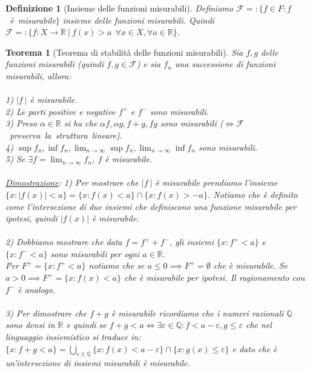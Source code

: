 \documentclass[a4paper,12pt]{report}
\newtheorem{teorema}{Teorema}[chapter]
\newtheorem{definizione}{Definizione}[chapter]
\newcommand{\lt}{<}
\newcommand{\gt}{>}
\begin{document}
\begin{definizione}[Insieme delle funzioni misurabili]
   Definiamo \mbox{$\mathcal{F}=:\{f \in F: f$ è misurabile$\}$} insieme delle funzioni misurabili. Quindi $\mathcal{F}=:\{f:X \to \mathbb{R} \ | \ f(x) \gt a \ \ \forall x \in X, \forall a \in \mathbb{R}\}$.
\end{definizione}

\begin{teorema}[Teorema di stabilità delle funzioni misurabili]\label{thm: 3.1} 
Sia $f,g$ delle funzioni misurabili (quindi $f,g \in \mathcal{F}$) e sia $f_n$ una successione di funzioni misurabili, allora:
\\
\\ 1) $|f \ |$ è misurabile.
\\ 2) Le parti positive e negative $f^+$ e $f^-$ sono misurabili.
\\ 3) Preso $\alpha \in \mathbb{R}$ si ha che $\alpha f, \alpha g, f+g, fg$ sono misurabili \mbox{($\iff \mathcal{F}$ preserva la struttura lineare).} 
\\ 4) $\sup f_n, \inf f_n, \displaystyle\lim_{n\to \infty}\sup f_n, \lim_{n\to \infty} \inf f_n$ sono misurabili.
\\ 5) Se $\exists f=\displaystyle\lim_{n\to\infty}f_n$, $f$ è misurabile.
\\
\\ \underline{Dimostrazione}: 1) Per mostrare che $|f \ |$ è misurabile prendiamo l'insieme 
\\$\{x: |f(x)|\lt a\}=\{x:f(x) \lt a\} \cap \{x: f(x) \gt - a\}$. Notiamo che è definito come l'intersezione di due insiemi che definiscono una funzione misurabile per ipotesi, quindi $|f(x)|$ è misurabile.
\\
\\ 2) Dobbiamo mostrare che data $f=f^++f^-$, gli insiemi $\{x: f^+\lt a\}$ e $\{x: f^- \lt a\}$ sono misurabili per ogni $a \in \mathbb{R}$.
\\ Per $F^+=\{x:f^+ \lt a\}$ notiamo che se $a \leq 0 \implies F^+=\emptyset$ che è misurabile. Se $a \gt 0\implies F^+=\{x:f(x)\lt a\}$ che è misurabile per ipotesi. Il ragionamento con $f^-$ è analogo.
\\
\\ 3) Per dimostrare che $f+g$ è misurabile ricordiamo che i numeri razionali $\mathbb{Q}$ sono densi in $\mathbb{R}$ e quindi se $f+g \lt a \iff \exists \varepsilon \in \mathbb{Q}: f\lt a-\varepsilon , g\leq \varepsilon$ che nel linguaggio insiemistico si traduce in: $\{x: f+g \lt a\}=\displaystyle\bigcup_{\varepsilon \in \mathbb{Q}}\{x:f(x)\lt a-\varepsilon\} \cap\{x:g(x) \leq\varepsilon\}$ e dato che è un'intersezione di insiemi misurabili è misurabile.

\end{teorema}
\end{document}
